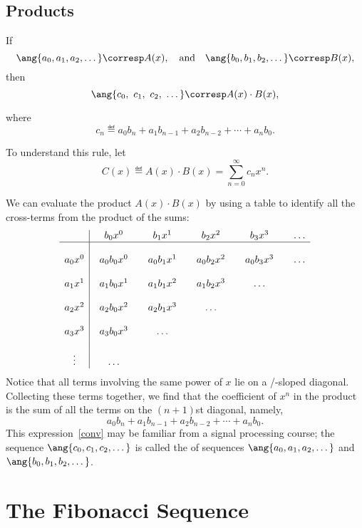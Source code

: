 \subsection{Products}

\begin{mathrule}
\label{rule:product}
If
%
\[
\ang{a_0, a_1, a_2, \dots} \corresp A(x),\quad \text{and}\quad
\ang{b_0, b_1, b_2, \dots} \corresp B(x),
\]
%
then
%
\[
\ang{c_0,\ c_1 ,\ c_2,\ \dots} \corresp A(x) \cdot B(x),
\]
\end{mathrule}
where
\[
c_n \eqdef a_0 b_n + a_1 b_{n-1} + a_2 b_{n-2} + \cdots + a_n b_0.
\]

To understand this rule, let
\[
C(x) \eqdef A(x) \cdot B(x) = \sum_{n=0}^{\infty} c_n x^n.
\]

We can evaluate the product $A(x) \cdot B(x)$ by using a table to identify
all the cross-terms from the product of the sums:
%
\[
\begin{array}{c|@{\quad}c@{\qquad}c@{\qquad}c@{\qquad}c@{\qquad}c}
        & b_0 x^0 & b_1 x^1 & b_2 x^2 & b_3 x^3 & \dots \\
\hline
\\
a_0 x^0 & a_0 b_0 x^0 & a_0 b_1 x^1 & a_0 b_2 x^2 & a_0 b_3 x^3 & \dots \\
\\
a_1 x^1 & a_1 b_0 x^1 & a_1 b_1 x^2 & a_1 b_2 x^3 & \dots \\
\\
a_2 x^2 & a_2 b_0 x^2 & a_2 b_1 x^3 & \dots \\
\\
a_3 x^3 & a_3 b_0 x^3 & \dots \\
\\
\vdots & \dots\\
\end{array}
\]
%
Notice that all terms involving the same power of $x$ lie on a
/-sloped diagonal.  Collecting these terms together, we find that the
coefficient of $x^n$ in the product is the sum of all the terms on the
$(n+1)$st diagonal, namely,
\begin{equation}\label{conv}
a_0 b_n + a_1 b_{n-1} + a_2 b_{n-2} + \cdots + a_n b_0.
\end{equation}
This expression~\eqref{conv} may be familiar from a signal processing
course; the sequence $\ang{c_0, c_1, c_2, \dots}$ is called the
 of sequences $\ang{a_0, a_1, a_2, \dots}$ and
$\ang{b_0, b_1, b_2, \dots}$.

\section{The Fibonacci Sequence}

